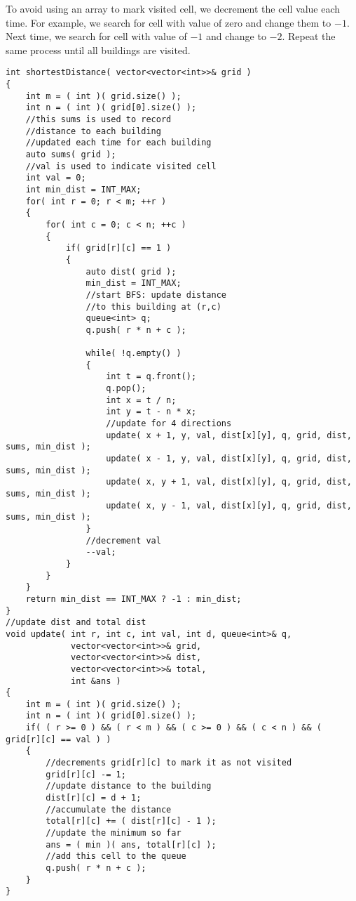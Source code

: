 To avoid using an array to mark visited cell, we decrement the cell value each time. For example, we search for cell with value of zero and change them to $-1$. Next time, we search for cell with value of $-1$ and change to $-2$. Repeat the same process until all buildings are visited.

\setcounter{lstlisting}{0}
\begin{lstlisting}[style=customc, caption={BFS}]
int shortestDistance( vector<vector<int>>& grid )
{
    int m = ( int )( grid.size() );
    int n = ( int )( grid[0].size() );
    //this sums is used to record
    //distance to each building
    //updated each time for each building
    auto sums( grid );
    //val is used to indicate visited cell
    int val = 0;
    int min_dist = INT_MAX;
    for( int r = 0; r < m; ++r )
    {
        for( int c = 0; c < n; ++c )
        {
            if( grid[r][c] == 1 )
            {
                auto dist( grid );
                min_dist = INT_MAX;
                //start BFS: update distance
                //to this building at (r,c)
                queue<int> q;
                q.push( r * n + c );

                while( !q.empty() )
                {
                    int t = q.front();
                    q.pop();
                    int x = t / n;
                    int y = t - n * x;
                    //update for 4 directions
                    update( x + 1, y, val, dist[x][y], q, grid, dist, sums, min_dist );
                    update( x - 1, y, val, dist[x][y], q, grid, dist, sums, min_dist );
                    update( x, y + 1, val, dist[x][y], q, grid, dist, sums, min_dist );
                    update( x, y - 1, val, dist[x][y], q, grid, dist, sums, min_dist );
                }
                //decrement val
                --val;
            }
        }
    }
    return min_dist == INT_MAX ? -1 : min_dist;
}
//update dist and total dist
void update( int r, int c, int val, int d, queue<int>& q,
             vector<vector<int>>& grid,
             vector<vector<int>>& dist,
             vector<vector<int>>& total,
             int &ans )
{
    int m = ( int )( grid.size() );
    int n = ( int )( grid[0].size() );
    if( ( r >= 0 ) && ( r < m ) && ( c >= 0 ) && ( c < n ) && ( grid[r][c] == val ) )
    {
        //decrements grid[r][c] to mark it as not visited
        grid[r][c] -= 1;
        //update distance to the building
        dist[r][c] = d + 1;
        //accumulate the distance
        total[r][c] += ( dist[r][c] - 1 );
        //update the minimum so far
        ans = ( min )( ans, total[r][c] );
        //add this cell to the queue
        q.push( r * n + c );
    }
}
\end{lstlisting}